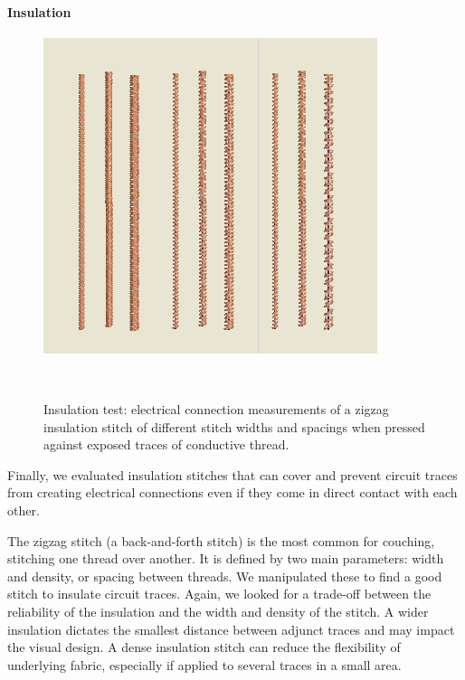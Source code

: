 \documentclass{sigchi}
\begin{document}
\paragraph{Insulation}
\begin{figure}
\centering
  \includegraphics[width=1\columnwidth]{figures/Insulation}
  \caption{Insulation test: electrical connection measurements of a zigzag insulation stitch of different stitch widths and spacings when pressed against exposed traces of conductive thread.}~\label{fig:Insulation}
  \vspace{-2em}
\end{figure}
Finally, we evaluated insulation stitches that can cover and prevent circuit traces from creating electrical connections even if they come in direct contact with each other.

The zigzag stitch (a back-and-forth stitch) is the most common for couching, stitching one thread over another. It is defined by two main parameters: width and density, or spacing between threads. We manipulated these to find a good stitch to insulate circuit traces. 
Again, we looked for a trade-off between the reliability of the insulation and the width and density of the stitch. A wider insulation dictates the smallest distance between adjunct traces and may impact the visual design. A dense insulation stitch can reduce the flexibility of underlying fabric, especially if applied to several traces in a small area.
\end{document}
